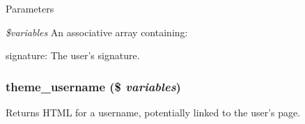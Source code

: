 \begin{DoxyParams}{Parameters}
\item[{\em \$variables}]An associative array containing:
\begin{DoxyItemize}
\item signature: The user's signature. 
\end{DoxyItemize}\end{DoxyParams}
\hypertarget{group__themeable_ga94b6d36f659ae6bf42e7971682cd24eb}{
\subsubsection[{theme\_\-username}]{\setlength{\rightskip}{0pt plus 5cm}theme\_\-username (\$ {\em variables})}}
\label{group__themeable_ga94b6d36f659ae6bf42e7971682cd24eb}
Returns HTML for a username, potentially linked to the user's page.


